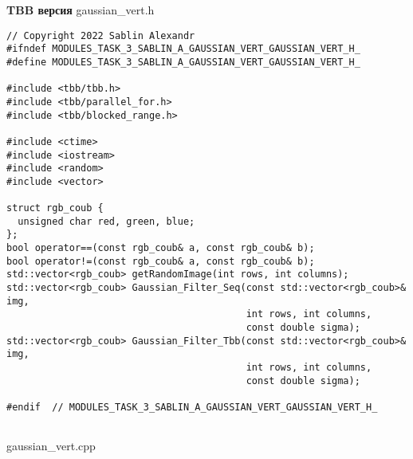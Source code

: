\documentclass{report}
\begin{document}
\textbf{TBB версия}
\newline
\newline gaussian\_vert.h
\begin{lstlisting}
// Copyright 2022 Sablin Alexandr
#ifndef MODULES_TASK_3_SABLIN_A_GAUSSIAN_VERT_GAUSSIAN_VERT_H_
#define MODULES_TASK_3_SABLIN_A_GAUSSIAN_VERT_GAUSSIAN_VERT_H_

#include <tbb/tbb.h>
#include <tbb/parallel_for.h>
#include <tbb/blocked_range.h>

#include <ctime>
#include <iostream>
#include <random>
#include <vector>

struct rgb_coub {
  unsigned char red, green, blue;
};
bool operator==(const rgb_coub& a, const rgb_coub& b);
bool operator!=(const rgb_coub& a, const rgb_coub& b);
std::vector<rgb_coub> getRandomImage(int rows, int columns);
std::vector<rgb_coub> Gaussian_Filter_Seq(const std::vector<rgb_coub>& img,
                                          int rows, int columns,
                                          const double sigma);
std::vector<rgb_coub> Gaussian_Filter_Tbb(const std::vector<rgb_coub>& img,
                                          int rows, int columns,
                                          const double sigma);

#endif  // MODULES_TASK_3_SABLIN_A_GAUSSIAN_VERT_GAUSSIAN_VERT_H_


\end{lstlisting}
gaussian\_vert.cpp
\end{document}
